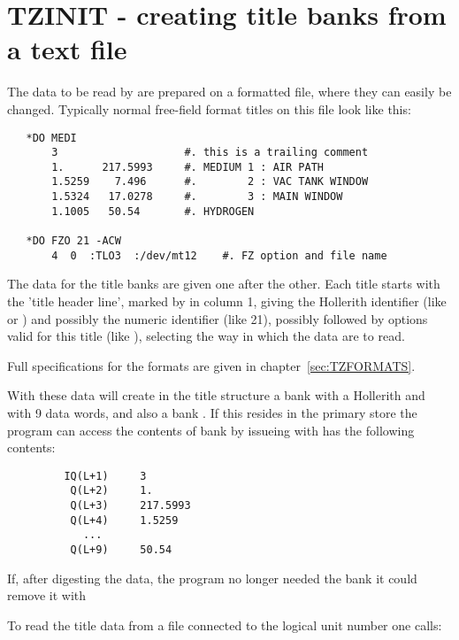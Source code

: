 \section{TZINIT - creating title banks from a text file}

The data to be read by  are prepared on a formatted file,
where they can easily be changed.
Typically normal free-field format titles on this file
look like this:

\begin{verbatim}
   *DO MEDI
       3                    #. this is a trailing comment
       1.      217.5993     #. MEDIUM 1 : AIR PATH
       1.5259    7.496      #.        2 : VAC TANK WINDOW
       1.5324   17.0278     #.        3 : MAIN WINDOW
       1.1005   50.54       #. HYDROGEN

   *DO FZO 21 -ACW
       4  0  :TLO3  :/dev/mt12    #. FZ option and file name
\end{verbatim} 

The data for the title banks are given one after the other.
Each title starts with the 'title header line',
marked by  in column 1,
giving the Hollerith identifier (like  or ) and
possibly the numeric identifier (like 21),
possibly followed by options valid for this title (like ),
selecting the way in which the data are to read.

Full specifications for the formats are given in chapter~\ref{sec:TZFORMATS}.

With these data  will create in the title structure a bank
with a Hollerith   and with 9 data words,
and also a bank .
If this resides in the primary store the program can 
access the contents of bank  by 
issueing  
with has the following contents:
\begin{verbatim}
         IQ(L+1)     3
          Q(L+2)     1.
          Q(L+3)     217.5993
          Q(L+4)     1.5259
            ...
          Q(L+9)     50.54
\end{verbatim} 

If, after digesting the data, the program no longer needed
the bank it could remove it with  

To read the title data from a file connected to the logical
unit number  one calls:


